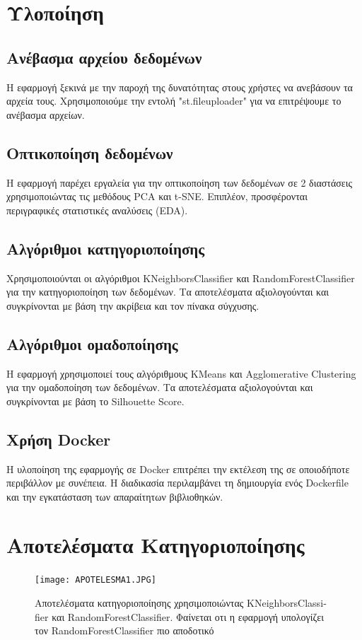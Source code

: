 \documentclass[a4paper,12pt]{article}
\begin{document}
\section{Υλοποίηση}

\subsection{Ανέβασμα αρχείου δεδομένων}
Η εφαρμογή ξεκινά με την παροχή της δυνατότητας στους χρήστες να ανεβάσουν τα αρχεία τους. Χρησιμοποιούμε την εντολή \textlatin{"st.fileuploader"} για να επιτρέψουμε το ανέβασμα αρχείων.

\subsection{Οπτικοποίηση δεδομένων}
Η εφαρμογή παρέχει εργαλεία για την οπτικοποίηση των δεδομένων σε 2 διαστάσεις χρησιμοποιώντας τις μεθόδους \textlatin{PCA} και \textlatin{t-SNE}. Επιπλέον, προσφέρονται περιγραφικές στατιστικές αναλύσεις (\textlatin{EDA}).

\subsection{Αλγόριθμοι κατηγοριοποίησης}
Χρησιμοποιούνται οι αλγόριθμοι \textlatin{KNeighborsClassifier} και \textlatin{RandomForestClassifier} για την κατηγοριοποίηση των δεδομένων. Τα αποτελέσματα αξιολογούνται και συγκρίνονται με βάση την ακρίβεια και τον πίνακα σύγχυσης.

\subsection{Αλγόριθμοι ομαδοποίησης}
Η εφαρμογή χρησιμοποιεί τους αλγόριθμους \textlatin{KMeans} και \textlatin{Agglomerative Clustering} για την ομαδοποίηση των δεδομένων. Τα αποτελέσματα αξιολογούνται και συγκρίνονται με βάση το \textlatin{Silhouette Score}.

\subsection{Χρήση \textlatin{Docker}}
Η υλοποίηση της εφαρμογής σε \textlatin{Docker} επιτρέπει την εκτέλεση της σε οποιοδήποτε περιβάλλον με συνέπεια. Η διαδικασία περιλαμβάνει τη δημιουργία ενός \textlatin{Dockerfile} και την εγκατάσταση των απαραίτητων βιβλιοθηκών.

\section{Αποτελέσματα Κατηγοριοποίησης}
\begin{figure}[h!]
\centering
\texttt{[image: APOTELESMA1.JPG]}
\caption{Αποτελέσματα κατηγοριοποίησης χρησιμοποιώντας \textlatin{KNeighborsClassifier} και \textlatin{RandomForestClassifier}. Φαίνεται οτι η εφαρμογή υπολογίζει τον \textlatin{RandomForestClassifier} πιο αποδοτικό }
\end{figure}
\end{document}
